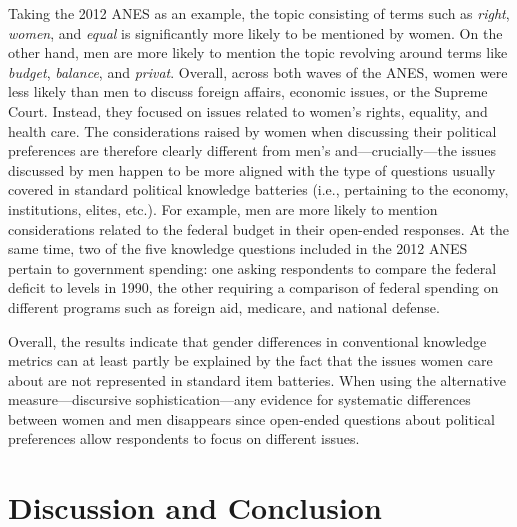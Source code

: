 Taking the 2012 ANES as an example, the topic consisting of terms such as \textit{right}, \textit{women}, and \textit{equal} is significantly more likely to be mentioned by women. On the other hand, men are more likely to mention the topic revolving around terms like \textit{budget}, \textit{balance}, and \textit{privat}. Overall, across both waves of the ANES, women were less likely than men to discuss foreign affairs, economic issues, or the Supreme Court. Instead, they focused on issues related to women's rights, equality, and health care. The considerations raised by women when discussing their political preferences are therefore clearly different from men's and---crucially---the issues discussed by men happen to be more aligned with the type of questions usually covered in standard political knowledge batteries (i.e., pertaining to the economy, institutions, elites, etc.). For example, men are more likely to mention considerations related to the federal budget in their open-ended responses. At the same time, two of the five knowledge questions included in the 2012 ANES pertain to government spending: one asking respondents to compare the federal deficit to levels in 1990, the other requiring a comparison of federal spending on different programs such as foreign aid, medicare, and national defense.

Overall, the results indicate that gender differences in conventional knowledge metrics can at least partly be explained by the fact that the issues women care about are not represented in standard item batteries. When using the alternative measure---discursive sophistication---any evidence for systematic differences between women and men disappears since open-ended questions about political preferences allow respondents to focus on different issues. 



\section*{Discussion and Conclusion}


